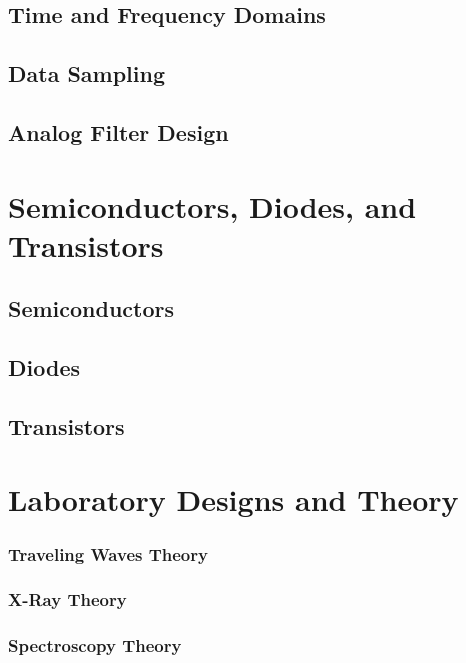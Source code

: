 \documentclass[12pt, a4paper, oneside, openright, titlepage]{book}
\begin{document}
\chapter{Time and Frequency Domains}


\chapter{Data Sampling}


\chapter{Analog Filter Design}



\part{Semiconductors, Diodes, and Transistors}


\chapter{Semiconductors}


\chapter{Diodes}



\chapter{Transistors}





\part{Laboratory Designs and Theory}



\begin{subappendices}

    \section{Traveling Waves Theory}


    \section{X-Ray Theory}

    \section{Spectroscopy Theory}


\end{subappendices}
\end{document}
